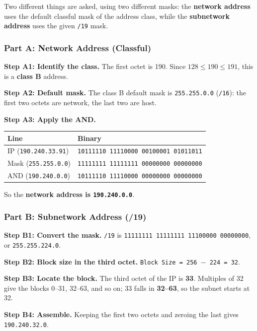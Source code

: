 \documentclass[11pt,a4paper]{article}
\begin{document}
Two different things are asked, using two different masks: the \textbf{network
address} uses the default classful mask of the address class, while the
\textbf{subnetwork address} uses the given \texttt{/19} mask.

\subsubsection*{Part A: Network Address (Classful)}

\textbf{Step A1: Identify the class.} The first octet is 190. Since
$128 \le 190 \le 191$, this is a \textbf{class B} address.

\textbf{Step A2: Default mask.} The class B default mask is
\texttt{255.255.0.0} (\texttt{/16}): the first two octets are network, the last
two are host.

\textbf{Step A3: Apply the AND.}

\begin{tabularx}{\textwidth}{@{}lX@{}}
\toprule
\rowcolor{tablehead}\textbf{Line} & \textbf{Binary} \\
\midrule
IP (\texttt{190.240.33.91}) & \texttt{10111110 11110000 00100001 01011011} \\
Mask (\texttt{255.255.0.0}) & \texttt{11111111 11111111 00000000 00000000} \\
AND (\texttt{190.240.0.0}) & \texttt{10111110 11110000 00000000 00000000} \\
\bottomrule
\end{tabularx}

So the \textbf{network address is \texttt{190.240.0.0}}.

\subsubsection*{Part B: Subnetwork Address (/19)}

\textbf{Step B1: Convert the mask.} \texttt{/19} is
\texttt{11111111 11111111 11100000 00000000}, or \texttt{255.255.224.0}.

\textbf{Step B2: Block size in the third octet.}
\texttt{Block Size = 256 $-$ 224 = 32}.

\textbf{Step B3: Locate the block.} The third octet of the IP is \textbf{33}.
Multiples of 32 give the blocks 0--31, 32--63, and so on; 33 falls in
\textbf{32--63}, so the subnet starts at 32.

\textbf{Step B4: Assemble.} Keeping the first two octets and zeroing the last
gives \texttt{190.240.32.0}.
\end{document}
